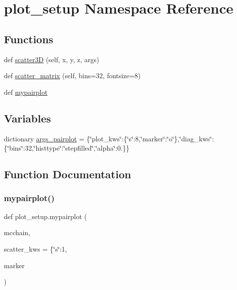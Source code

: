 \hypertarget{namespaceplot__setup}{}\section{plot\+\_\+setup Namespace Reference}
\label{namespaceplot__setup}
\subsection*{Functions}
\begin{DoxyCompactItemize}
\item 
def \hyperlink{namespaceplot__setup_ae1d4aed021e4401e81d9dd0d242c7e2b}{scatter3D} (self, x, y, z, args)
\item 
def \hyperlink{namespaceplot__setup_a436a0609e4c2316379efdf45718260cb}{scatter\+\_\+matrix} (self, bins=32, fontsize=8)
\item 
def \hyperlink{namespaceplot__setup_a626de41aaef50f238db0fdd3d2f6ae4f}{mypairplot}
\end{DoxyCompactItemize}
\subsection*{Variables}
\begin{DoxyCompactItemize}
\item 
dictionary \hyperlink{namespaceplot__setup_a8623d9c662ed254a9fdbb579db7c57c2}{args\+\_\+pairplot} = \{\char`\"{}plot\+\_\+kws\char`\"{}\+:\{\char`\"{}s\char`\"{}\+:8,\char`\"{}marker\char`\"{}\+:\char`\"{}o\char`\"{}\},\char`\"{}diag\+\_\+kws\char`\"{}\+:\{\char`\"{}bins\char`\"{}\+:32,\char`\"{}histtype\char`\"{}\+:\char`\"{}stepfilled\char`\"{},\char`\"{}alpha\char`\"{}\+:0.\}\}
\end{DoxyCompactItemize}


\subsection{Function Documentation}
\mbox{\label{namespaceplot__setup_a626de41aaef50f238db0fdd3d2f6ae4f}} 
\subsubsection{\texorpdfstring{mypairplot()}{mypairplot()}}
{\footnotesize\ttfamily def plot\+\_\+setup.\+mypairplot (\begin{DoxyParamCaption}\item[{}]{mcchain,  }\item[{}]{scatter\+\_\+kws = {\ttfamily \{\char`\"{}s\char`\"{}\+:1},  }\item[{}]{marker }\end{DoxyParamCaption})}



